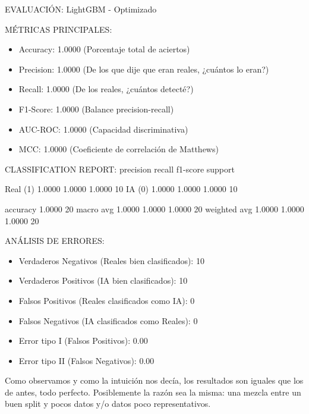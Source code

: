  EVALUACIÓN: LightGBM - Optimizado

MÉTRICAS PRINCIPALES:
\begin{itemize}
	\item Accuracy:  1.0000  (Porcentaje total de aciertos)
	\item Precision: 1.0000  (De los que dije que eran reales, ¿cuántos lo eran?)
	\item Recall:    1.0000  (De los reales, ¿cuántos detecté?)
	\item F1-Score:  1.0000  (Balance precision-recall)
	\item AUC-ROC:   1.0000  (Capacidad discriminativa)
	\item MCC:       1.0000  (Coeficiente de correlación de Matthews)
\end{itemize}

CLASSIFICATION REPORT:
              precision    recall  f1-score   support

    Real (1)     1.0000    1.0000    1.0000        10
      IA (0)     1.0000    1.0000    1.0000        10

    accuracy                         1.0000        20
   macro avg     1.0000    1.0000    1.0000        20
weighted avg     1.0000    1.0000    1.0000        20


ANÁLISIS DE ERRORES:
\begin{itemize}
	\item Verdaderos Negativos (Reales bien clasificados): 10
	\item Verdaderos Positivos (IA bien clasificados): 10
	\item Falsos Positivos (Reales clasificados como IA): 0
	\item Falsos Negativos (IA clasificados como Reales): 0
	\item Error tipo I (Falsos Positivos): 0.00%
	\item Error tipo II (Falsos Negativos): 0.00%
\end{itemize}

Como observamos y como la intuición nos decía, los resultados son iguales que los de antes, todo perfecto. Posiblemente la razón sea la misma: una mezcla entre un buen split y pocos datos y/o datos poco representativos.